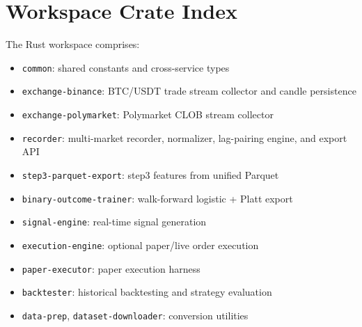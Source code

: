 \section{Workspace Crate Index}
\label{app:crates}

The Rust workspace comprises:
\begin{itemize}
  \item \texttt{common}: shared constants and cross-service types
  \item \texttt{exchange-binance}: BTC/USDT trade stream collector and candle
        persistence
  \item \texttt{exchange-polymarket}: Polymarket CLOB stream collector
  \item \texttt{recorder}: multi-market recorder, normalizer, lag-pairing engine,
        and export API
  \item \texttt{step3-parquet-export}: step3 features from unified Parquet
  \item \texttt{binary-outcome-trainer}: walk-forward logistic + Platt export
  \item \texttt{signal-engine}: real-time signal generation
  \item \texttt{execution-engine}: optional paper/live order execution
  \item \texttt{paper-executor}: paper execution harness
  \item \texttt{backtester}: historical backtesting and strategy evaluation
  \item \texttt{data-prep}, \texttt{dataset-downloader}: conversion utilities
\end{itemize}